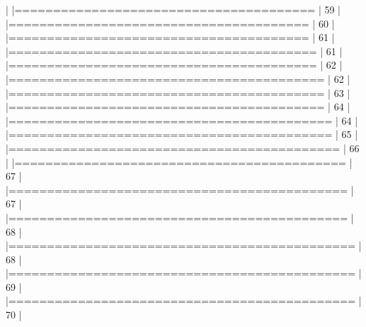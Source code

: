 \documentclass[10pt]{article}
\newenvironment{CodeChunk}{}{}
\begin{document}
\begin{CodeChunk}
\begin{CodeChunk}
\begin{CodeOutput}
  |                                                                       
  |=======================================                          |  59%
  |                                                                       
  |=======================================                          |  60%
  |                                                                       
  |=======================================                          |  61%
  |                                                                       
  |========================================                         |  61%
  |                                                                       
  |========================================                         |  62%
  |                                                                       
  |=========================================                        |  62%
  |                                                                       
  |=========================================                        |  63%
  |                                                                       
  |=========================================                        |  64%
  |                                                                       
  |==========================================                       |  64%
  |                                                                       
  |==========================================                       |  65%
  |                                                                       
  |===========================================                      |  66%
  |                                                                       
  |===========================================                      |  67%
  |                                                                       
  |============================================                     |  67%
  |                                                                       
  |============================================                     |  68%
  |                                                                       
  |=============================================                    |  68%
  |                                                                       
  |=============================================                    |  69%
  |                                                                       
  |=============================================                    |  70%
  |                                                                       

\end{CodeOutput}
\end{CodeChunk}
\end{CodeChunk}
\end{document}

